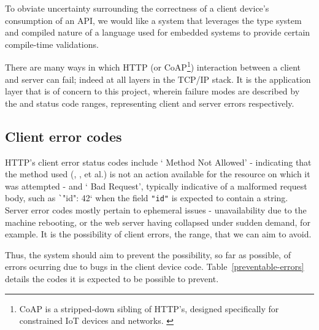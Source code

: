 To obviate uncertainty surrounding the correctness of a client device's consumption of an API, we would like a system that leverages the type system and compiled nature of a language used for embedded systems to provide certain compile-time validations.

There are many ways in which HTTP (or CoAP\footnote{CoAP is a stripped-down sibling of HTTP's, designed specifically for constrained IoT devices and networks. \cite{rfc7252}}) interaction between a client and server can fail; indeed at all layers in the TCP/IP stack. It is the application layer that is of concern to this project, wherein failure modes are described by the  and  status code ranges, representing client and server errors respectively.

\subsection{Client error codes}\label{client-errors}
HTTP's client error status codes include ` Method Not Allowed' - indicating that the method used (, , et al.) is not an action available for the resource on which it was attempted - and ` Bad Request', typically indicative of a malformed request body, such as \texttt`{"id": 42}` when the field \texttt{"id"} is expected to contain a string. Server error codes mostly pertain to ephemeral issues - unavailability due to the machine rebooting, or the web server having collapsed under sudden demand, for example. It is the possibility of client errors, the  range, that we can aim to avoid.

Thus, the system should aim to prevent the possibility, so far as possible, of errors ocurring due to bugs in the client device code. Table~\ref{preventable-errors} details the codes it is expected to be possible to prevent.

